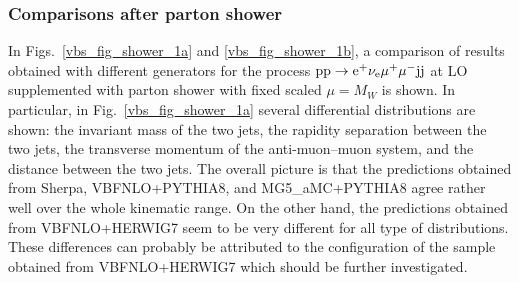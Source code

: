 \documentclass[11pt]{cernrep}
\begin{document}
\subsubsection*{Comparisons after parton shower}

In Figs.~\ref{vbs_fig_shower_1a} and \ref{vbs_fig_shower_1b}, a comparison of results obtained with different
generators for the process ${\rm p} {\rm p} \to {\rm e}^+  \nu_{\rm e}  \mu^+ \mu^- {\rm j} {\rm j}$ at LO supplemented with parton shower with fixed scaled $\mu =M_W$ is shown. 
In particular, in Fig.~\ref{vbs_fig_shower_1a} several differential distributions are shown:
the invariant mass of the two jets, the rapidity separation between the two jets, the transverse momentum of the anti-muon--muon system, and the distance between the two jets.
The overall picture is that the predictions obtained from {\sc Sherpa}, {\sc VBFNLO}+{\sc PYTHIA8}, and {\sc MG5\_aMC}+{\sc PYTHIA8} agree rather well over the whole kinematic range.
On the other hand, the predictions obtained from {\sc VBFNLO}+{\sc HERWIG7} seem to be very different for all type of distributions.
These differences can probably be attributed to the configuration of the sample obtained from {\sc VBFNLO}+{\sc HERWIG7} which should be further investigated.
\end{document}
